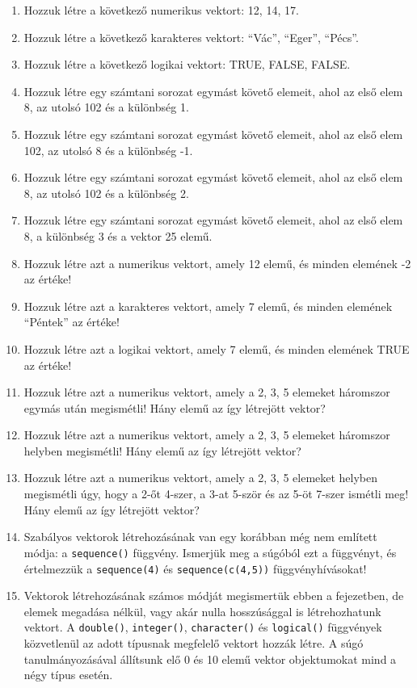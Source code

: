 \documentclass[
]{book}
\makeatletter
\providecommand{\tightlist}{%
  \setlength{\itemsep}{0pt}\setlength{\parskip}{0pt}}
\newenvironment{kframe}{%
\medskip{}
\setlength{\fboxsep}{.8em}
 \def\at@end@of@kframe{}%
 \ifinner\ifhmode%
  \def\at@end@of@kframe{\end{minipage}}%
  \begin{minipage}{\columnwidth}%
 \fi\fi%
 \def\FrameCommand##1{\hskip\@totalleftmargin \hskip-\fboxsep
 \colorbox{shadecolor}{##1}\hskip-\fboxsep
     \hskip-\linewidth \hskip-\@totalleftmargin \hskip\columnwidth}%
 \MakeFramed {\advance\hsize-\width
   \@totalleftmargin\z@ \linewidth\hsize
   \@setminipage}}%
 {\par\unskip\endMakeFramed%
 \at@end@of@kframe}
\newenvironment{rmdblock}[1]
  {
  \begin{itemize}
  \renewcommand{\labelitemi}{
    \raisebox{-.7\height}[0pt][0pt]{
      {\setkeys{Gin}{width=3em,keepaspectratio}\texttt{[image: images/\#1]}}
    }
  }
  \setlength{\fboxsep}{1em}
  \begin{kframe}
  \item
  }
  {
  \end{kframe}
  \end{itemize}
  }
\newenvironment{rmdexercise}
  {\begin{rmdblock}{exercise}}
  {\end{rmdblock}}
\makeatother
\begin{document}
\begin{rmdexercise}
\begin{enumerate}
\def\labelenumi{\arabic{enumi}.}
\tightlist
\item
  Hozzuk létre a következő numerikus vektort: 12, 14, 17.
\item
  Hozzuk létre a következő karakteres vektort: ``Vác'', ``Eger'', ``Pécs''.
\item
  Hozzuk létre a következő logikai vektort: TRUE, FALSE, FALSE.
\item
  Hozzuk létre egy számtani sorozat egymást követő elemeit, ahol az első elem 8, az utolsó 102 és a különbség 1.
\item
  Hozzuk létre egy számtani sorozat egymást követő elemeit, ahol az első elem 102, az utolsó 8 és a különbség -1.
\item
  Hozzuk létre egy számtani sorozat egymást követő elemeit, ahol az első elem 8, az utolsó 102 és a különbség 2.
\item
  Hozzuk létre egy számtani sorozat egymást követő elemeit, ahol az első elem 8, a különbség 3 és a vektor 25 elemű.
\item
  Hozzuk létre azt a numerikus vektort, amely 12 elemű, és minden elemének -2 az értéke!
\item
  Hozzuk létre azt a karakteres vektort, amely 7 elemű, és minden elemének ``Péntek'' az értéke!
\item
  Hozzuk létre azt a logikai vektort, amely 7 elemű, és minden elemének TRUE az értéke!
\item
  Hozzuk létre azt a numerikus vektort, amely a 2, 3, 5 elemeket háromszor egymás után megismétli! Hány elemű az így létrejött vektor?
\item
  Hozzuk létre azt a numerikus vektort, amely a 2, 3, 5 elemeket háromszor helyben megismétli! Hány elemű az így létrejött vektor?
\item
  Hozzuk létre azt a numerikus vektort, amely a 2, 3, 5 elemeket helyben megismétli úgy, hogy a 2-őt 4-szer, a 3-at 5-ször és az 5-öt 7-szer ismétli meg! Hány elemű az így létrejött vektor?
\item
  Szabályos vektorok létrehozásának van egy korábban még nem említett módja: a \texttt{sequence()} függvény. Ismerjük meg a súgóból ezt a függvényt, és értelmezzük a \texttt{sequence(4)} és \texttt{sequence(c(4,5))} függvényhívásokat!
\item
  Vektorok létrehozásának számos módját megismertük ebben a fejezetben, de elemek megadása nélkül, vagy akár nulla hosszúsággal is létrehozhatunk vektort. A \texttt{double()}, \texttt{integer()}, \texttt{character()} és \texttt{logical()} függvények közvetlenül az adott típusnak megfelelő vektort hozzák létre. A súgó tanulmányozásával állítsunk elő 0 és 10 elemű vektor objektumokat mind a négy típus esetén.

\end{enumerate}
\end{rmdexercise}
\end{document}
